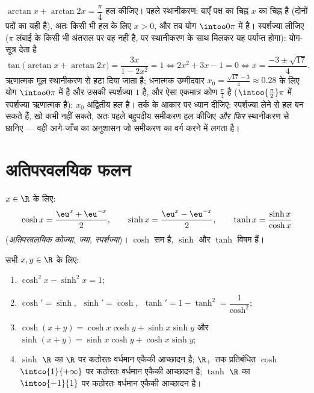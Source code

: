 \begin{example}[प्रतिलोम स्पर्शज्या वाला एक समीकरण]\label{ex:b1:functions:arctaneq}
$\arctan x + \arctan 2x = \dfrac\pi4$ हल कीजिए। पहले स्थानीकरण: बाएँ पक्ष का
चिह्न $x$ का चिह्न है (दोनों पदों का यही है), अतः किसी भी हल के लिए $x > 0$,
और तब योग $\intoo0\pi$ में है। स्पर्शज्या लीजिए ($\pi$ लंबाई के किसी भी
अंतराल पर वह  नहीं है, पर स्थानीकरण के साथ मिलकर यह पर्याप्त होगा):
योग-सूत्र देता है
\[
\tan\bigl(\arctan x + \arctan 2x\bigr)
= \frac{3x}{1 - 2x^2} = 1
\iff 2x^2 + 3x - 1 = 0
\iff x = \frac{-3 \pm \sqrt{17}}4 .
\]
ऋणात्मक मूल स्थानीकरण से हटा दिया जाता है; धनात्मक उम्मीदवार $x_0 =
\frac{\sqrt{17} - 3}4 \approx 0.28$ के लिए योग $\intoo0\pi$ में है और उसकी
स्पर्शज्या $1$ है, और ऐसा एकमात्र कोण $\frac\pi4$ है ($\intoo{\frac\pi2}\pi$
में स्पर्शज्या ऋणात्मक है): $x_0$ अद्वितीय हल है। तर्क के आकार पर ध्यान
दीजिए: स्पर्शज्या लेने से हल बन सकते हैं, खो कभी नहीं सकते, अतः पहले बहुपदीय
समीकरण हल कीजिए \emph{और फिर} स्थानीकरण से छानिए --- वही आगे-जाँच का अनुशासन
जो समीकरण का वर्ग करने में लगता है।
\end{example}

\section{अतिपरवलयिक फलन}

\begin{definition}[$\cosh$, $\sinh$, $\tanh$]\label{def:b1:functions:hyperbolic}
$x \in \R$ के लिए:
\[
\cosh x = \frac{\eu^x + \eu^{-x}}{2},
\qquad
\sinh x = \frac{\eu^x - \eu^{-x}}{2},
\qquad
\tanh x = \frac{\sinh x}{\cosh x}
\]
(\emph{अतिपरवलयिक कोज्या, ज्या, स्पर्शज्या})। $\cosh$
सम है, $\sinh$ और $\tanh$ विषम हैं।
\end{definition}

\begin{proposition}[मूल गुणधर्म]\label{prop:b1:functions:hyprules}
सभी $x, y \in \R$ के लिए:
\begin{enumerate}
  \item $\cosh^2 x - \sinh^2 x = 1$;
  \item $\cosh' = \sinh$, $\;\sinh' = \cosh$, $\;\tanh' = 1 - \tanh^2
        = \dfrac{1}{\cosh^2}$;
  \item $\cosh(x+y) = \cosh x\cosh y + \sinh x \sinh y$ और $\sinh(x+y) =
  \sinh x \cosh y + \cosh x \sinh y$;
  \item $\sinh$ $\R$ का $\R$ पर कठोरतः वर्धमान एकैकी आच्छादन है; $\R_+$ तक
  प्रतिबंधित $\cosh$ $\intco{1}{+\infty}$ पर कठोरतः वर्धमान एकैकी आच्छादन
  है; $\tanh$ $\R$ का $\intoo{-1}{1}$ पर कठोरतः वर्धमान एकैकी आच्छादन है।
\end{enumerate}
\end{proposition}

